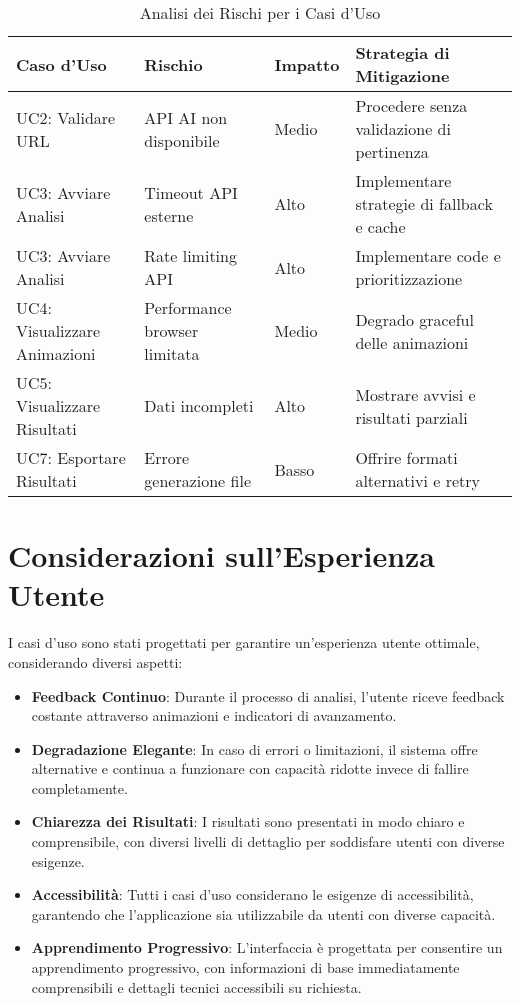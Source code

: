 \begin{table}[H]
\centering
\begin{tabular}{|l|l|l|l|}
\hline
\textbf{Caso d'Uso} & \textbf{Rischio} & \textbf{Impatto} & \textbf{Strategia di Mitigazione} \\
\hline
UC2: Validare URL & API AI non disponibile & Medio & Procedere senza validazione di pertinenza \\
\hline
UC3: Avviare Analisi & Timeout API esterne & Alto & Implementare strategie di fallback e cache \\
\hline
UC3: Avviare Analisi & Rate limiting API & Alto & Implementare code e prioritizzazione \\
\hline
UC4: Visualizzare Animazioni & Performance browser limitata & Medio & Degrado graceful delle animazioni \\
\hline
UC5: Visualizzare Risultati & Dati incompleti & Alto & Mostrare avvisi e risultati parziali \\
\hline
UC7: Esportare Risultati & Errore generazione file & Basso & Offrire formati alternativi e retry \\
\hline
\end{tabular}
\caption{Analisi dei Rischi per i Casi d'Uso}
\label{table:use-case-risks}
\end{table}

\section{Considerazioni sull'Esperienza Utente}
I casi d'uso sono stati progettati per garantire un'esperienza utente ottimale, considerando diversi aspetti:

\begin{itemize}
    \item \textbf{Feedback Continuo}: Durante il processo di analisi, l'utente riceve feedback costante attraverso animazioni e indicatori di avanzamento.
    
    \item \textbf{Degradazione Elegante}: In caso di errori o limitazioni, il sistema offre alternative e continua a funzionare con capacità ridotte invece di fallire completamente.
    
    \item \textbf{Chiarezza dei Risultati}: I risultati sono presentati in modo chiaro e comprensibile, con diversi livelli di dettaglio per soddisfare utenti con diverse esigenze.
    
    \item \textbf{Accessibilità}: Tutti i casi d'uso considerano le esigenze di accessibilità, garantendo che l'applicazione sia utilizzabile da utenti con diverse capacità.
    
    \item \textbf{Apprendimento Progressivo}: L'interfaccia è progettata per consentire un apprendimento progressivo, con informazioni di base immediatamente comprensibili e dettagli tecnici accessibili su richiesta.
\end{itemize}
